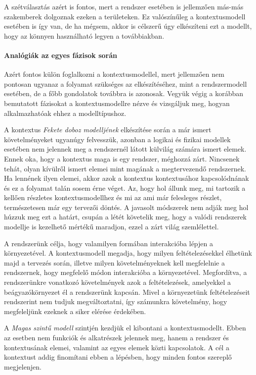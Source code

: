            A szétválasztás azért is fontos, mert a rendszer esetében is jellemzően más-más szakemberek dolgoznak ezeken a területeken. Ez valószínűleg a kontextusmodell esetében is így van, de ha mégsem, akkor is célszerű úgy elkészíteni ezt a modellt, hogy az könnyen használható legyen a továbbiakban.

            \paragraph{Analógiák az egyes fázisok során}
            Azért fontos külön foglalkozni a kontextusmodellel, mert jellemzően nem pontosan ugyanaz a folyamat szükséges az elkészítéséhez, mint a rendszermodell esetében, de a főbb gondolatok továbbra is azonosak.
            Vegyük végig a korábban bemutatott fázisokat a kontextusmodellre nézve és vizsgáljuk meg, hogyan alkalmazhatóak ehhez a modelltípushoz.

            A kontextus \emph{Fekete doboz modelljének} elkészítése során a már ismert követelményeket ugyanúgy felvesszük, azonban a logikai és fizikai modellek esetében nem jelennek meg a rendszernél látott külvilág számára ismert elemek.
            Ennek oka, hogy a kontextus maga is egy rendszer, méghozzá zárt. Nincsenek tehát, olyan kívülről ismert elemei mint magának a megtervezendő rendszernek. Ha lennének ilyen elemei, akkor azok a kontextus kontextusához kapcsolódnának és ez a folyamat talán sosem érne véget.
            Az, hogy hol állunk meg, mi tartozik a kellően részletes kontextusmodellhez és mi az ami már felesleges részlet, természetesen már egy tervezői döntés. A javasolt módszerek nem adják meg hol húzzuk meg ezt a határt, csupán a létét követelik meg, hogy a valódi rendszerek modellje is kezelhető mértékű maradjon, ezzel a zárt világ szemlélettel.

            A rendszerünk célja, hogy valamilyen formában interakcióba lépjen a környezetével. A kontextusmodell megadja, hogy milyen feltételezésekkel élhetünk majd a tervezés során, illetve milyen követelményeknek kell megfelelnie a rendszernek, hogy megfelelő módon interakcióba a környezetével.
            Megfordítva, a rendszerünkre vonatkozó követelmények azok a feltételezések, amelyekkel a beágyazókörnyezet él a rendszerünk kapcsán. Mivel a környezetünk feltételezéseit rendszerint nem tudjuk megváltoztatni, így számunkra követelmény, hogy megfeleljünk ezeknek a siker elérése érdekében.

            A \emph{Magas szintű modell} szintjén kezdjük el kibontani a kontextusmodellt. Ebben az esetben nem funkciók és alkatrészek jelennek meg, hanem a rendszer és kontextusának elemei, valamint az egyes elemek közti kapcsolatok.
            A cél a kontextust addig finomítani ebben a lépésben, hogy minden fontos szereplő megjelenjen.
            
